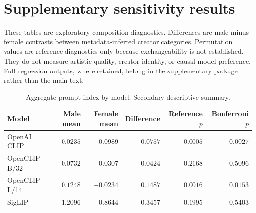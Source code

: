 \documentclass[pdflatex,sn-basic,Numbered]{sn-jnl}
\begin{document}
\appendix
\section{Supplementary sensitivity results}
\label{app:supp}

These tables are exploratory composition diagnostics. Differences are male-minus-female contrasts between metadata-inferred creator categories. Permutation values are reference diagnostics only because exchangeability is not established. They do not measure artistic quality, creator identity, or causal model preference. Full regression outputs, where retained, belong in the supplementary package rather than the main text.

\begin{table}[htbp]
\centering
\caption{Aggregate prompt index by model. Secondary descriptive summary.}
\label{tab:mainresults}
\scriptsize
\begin{tabular}{lrrrrr}
\toprule
Model & Male mean & Female mean & Difference & Reference $p$ & Bonferroni $p$ \\
\midrule
OpenAI CLIP & $-0.0235$ & $-0.0989$ & $0.0757$ & $0.0005$ & $0.0027$ \\
OpenCLIP B/32 & $-0.0732$ & $-0.0307$ & $-0.0424$ & $0.2168$ & $0.5096$ \\
OpenCLIP L/14 & $0.1248$ & $-0.0234$ & $0.1487$ & $0.0016$ & $0.0153$ \\
SigLIP & $-1.2096$ & $-0.8644$ & $-0.3457$ & $0.1995$ & $0.5403$ \\
\bottomrule
\end{tabular}
\end{table}
\end{document}
